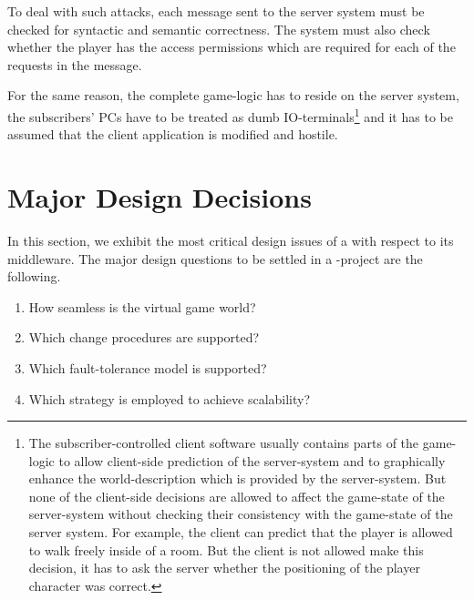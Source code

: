 \documentclass[a4paper, 10pt]{book}
\begin{document}
To deal with such attacks, each message sent to the server system must
be checked for syntactic and semantic correctness. The system must also
check whether the player has the access permissions which are required
for each of the requests in the message.

For the same reason, the complete game-logic has to reside on the
server system, the subscribers' PCs have to be treated as dumb
IO-terminals\footnote{The subscriber-controlled client software
usually contains parts of the game-logic to allow client-side
prediction of the server-system and to graphically enhance the world-description
which is provided by the server-system.
%
But none of the client-side decisions are allowed to affect
the game-state of the server-system without checking their
consistency with the game-state of the server system.
%
For example, the client can predict that the player is allowed to
walk freely inside of a room. But the client is not allowed make
this decision, it has to ask the server whether the positioning of
the player character was correct.}  and it has to be assumed that
the client application is modified and hostile.
%


\section{Major Design Decisions}

In this section, we exhibit the most critical design issues of a
\MMORG with respect to its middleware. The major design questions to be
settled in a \MMORG-project are the following.
\begin{enumerate}
    \item How seamless is the virtual game world? 
        \item Which change procedures are supported?
            \item Which fault-tolerance model is supported?
                \item Which strategy is employed to achieve scalability?
            \end{enumerate}
\end{document}

